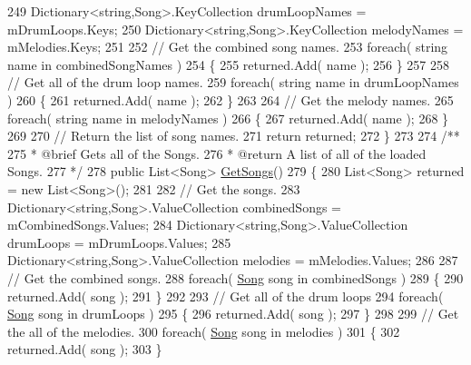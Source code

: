 \begin{DoxyCodeInclude}
249         Dictionary<string,Song>.KeyCollection drumLoopNames = mDrumLoops.Keys;
250         Dictionary<string,Song>.KeyCollection melodyNames = mMelodies.Keys;
251 
252         \textcolor{comment}{// Get the combined song names.}
253         \textcolor{keywordflow}{foreach}( \textcolor{keywordtype}{string} name \textcolor{keywordflow}{in} combinedSongNames )
254         \{
255             returned.Add( name );
256         \}
257 
258         \textcolor{comment}{// Get all of the drum loop names.}
259         \textcolor{keywordflow}{foreach}( \textcolor{keywordtype}{string} name \textcolor{keywordflow}{in} drumLoopNames )
260         \{
261             returned.Add( name );
262         \}
263 
264         \textcolor{comment}{// Get the melody names.}
265         \textcolor{keywordflow}{foreach}( \textcolor{keywordtype}{string} name \textcolor{keywordflow}{in} melodyNames )
266         \{
267             returned.Add( name );
268         \}
269 
270         \textcolor{comment}{// Return the list of song names.}
271         \textcolor{keywordflow}{return} returned;
272     \}
273 \textcolor{comment}{}
274 \textcolor{comment}{    /** }
275 \textcolor{comment}{     * @brief Gets all of the Songs.}
276 \textcolor{comment}{     * @return A list of all of the loaded Songs.}
277 \textcolor{comment}{    */}
278     \textcolor{keyword}{public} List<Song> \hyperlink{group___s_m_pub_func_ga3bf6a6d42a7c5e94cc85ba10eb9e6edb}{GetSongs}()
279     \{
280         List<Song> returned = \textcolor{keyword}{new} List<Song>();
281 
282         \textcolor{comment}{// Get the songs.}
283         Dictionary<string,Song>.ValueCollection combinedSongs = mCombinedSongs.Values;
284         Dictionary<string,Song>.ValueCollection drumLoops = mDrumLoops.Values;
285         Dictionary<string,Song>.ValueCollection melodies = mMelodies.Values;
286 
287         \textcolor{comment}{// Get the combined songs.}
288         \textcolor{keywordflow}{foreach}( \hyperlink{class_song}{Song} song \textcolor{keywordflow}{in} combinedSongs )
289         \{
290             returned.Add( song );
291         \}
292 
293         \textcolor{comment}{// Get all of the drum loops}
294         \textcolor{keywordflow}{foreach}( \hyperlink{class_song}{Song} song \textcolor{keywordflow}{in} drumLoops )
295         \{
296             returned.Add( song );
297         \}
298 
299         \textcolor{comment}{// Get the all of the melodies.}
300         \textcolor{keywordflow}{foreach}( \hyperlink{class_song}{Song} song \textcolor{keywordflow}{in} melodies )
301         \{
302             returned.Add( song );
303         \}

\end{DoxyCodeInclude}
